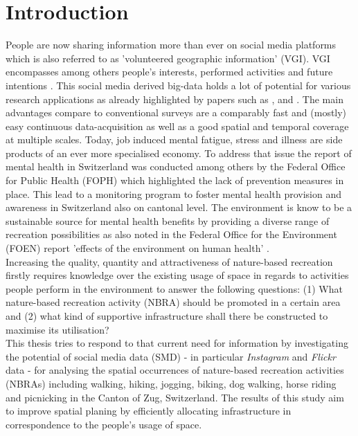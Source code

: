 \chapter{Introduction}
People are now sharing information more than ever on social media platforms which is also referred to as 'volunteered geographic information' (VGI). VGI encompasses among others people's interests, performed activities and future intentions \parencite{Goodchild2007}. This social media derived big-data holds a lot of potential for various research applications as already highlighted by papers such as \parencite{DiMinin2015}, \parencite{DiMinin2017} and \parencite{Meentemeyer2016}. The main advantages compare to conventional surveys are a comparably fast and (mostly) easy continuous data-acquisition as well as a good spatial and temporal coverage at multiple scales.
\newline
Today, job induced mental fatigue, stress and illness are side products of an ever more specialised economy. To address that issue the report of mental health in Switzerland \parencite{Ruesch2003} was conducted among others by the Federal Office for Public Health (FOPH) which highlighted the lack of prevention measures in place. This lead to a monitoring program to foster mental health provision and awareness in Switzerland \parencite{Schuler2012} also on cantonal level. The environment is know to be a sustainable source for mental health benefits by providing a diverse range of recreation possibilities as also noted in the Federal Office for the Environment (FOEN) report 'effects of the environment on human health' \parencite{Ragettli2017}.\\
\newline
Increasing the quality, quantity and attractiveness of nature-based recreation firstly requires knowledge over the existing usage of space in regards to activities people perform in the environment to answer the following questions: (1) What nature-based recreation activity (NBRA) should be promoted in a certain area and (2) what kind of supportive infrastructure shall there be constructed to maximise its utilisation? \\
This thesis tries to respond to that current need for information by investigating the potential of social media data (SMD) - in particular \textit{Instagram} and \textit{Flickr} data - for analysing the spatial occurrences of nature-based recreation activities (NBRAs) including walking, hiking, jogging, biking, dog walking, horse riding and picnicking in the Canton of Zug, Switzerland. The results of this study aim to improve spatial planing by efficiently allocating infrastructure in correspondence to the people's usage of space.\\
